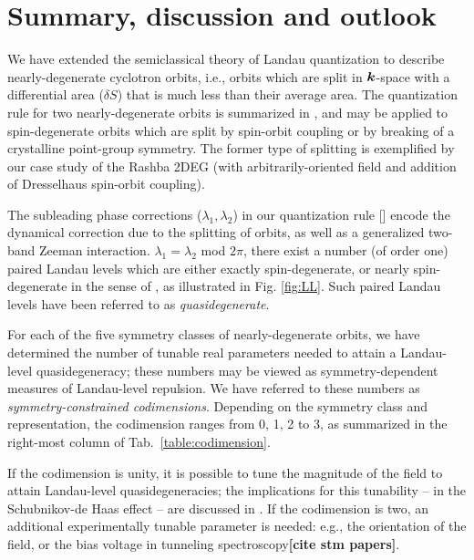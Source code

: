 \documentclass[aps, prb, showpacs, twocolumn, notitlepage, superscriptaddress]{revtex4-1}
\begin{document}


\section{Summary, discussion and outlook}\label{sec:discussion}

We have extended the semiclassical theory of Landau quantization to describe nearly-degenerate cyclotron orbits, i.e., orbits which are split in $\boldsymbol{k}$-space with a differential area ($\delta S$) that is much less than their average area. The quantization rule for two nearly-degenerate orbits is summarized in , and may be applied to spin-degenerate orbits which are split by spin-orbit coupling or by breaking of a crystalline point-group symmetry. The former type of splitting is exemplified by  our case study of the Rashba 2DEG (with arbitrarily-oriented field and addition of Dresselhaus spin-orbit coupling).

The subleading phase corrections ($\lambda_1,\lambda_2$) in our quantization rule  [] encode the dynamical correction due to the splitting of  orbits, as well as a generalized two-band Zeeman interaction. $\lambda_1{=}\lambda_2$ mod $2\pi$, there exist a number (of order one) paired Landau levels which are either exactly spin-degenerate, or nearly spin-degenerate in the sense of , as illustrated in Fig. \ref{fig:LL}. Such paired Landau levels have been referred to as \textit{quasidegenerate}.

For each of the five symmetry classes of nearly-degenerate orbits, we have determined the number of tunable real parameters needed to attain a Landau-level quasidegeneracy; these numbers may be viewed as symmetry-dependent measures of Landau-level repulsion. We have referred to these numbers as \textit{symmetry-constrained codimensions}. Depending on the symmetry class and representation, the codimension ranges from 0, 1, 2 to 3, as summarized in the right-most column of Tab.\ \ref{table:codimension}.

If the codimension is unity, it is possible to tune the magnitude of the field to attain Landau-level quasidegeneracies; the implications for this tunability -- in the Schubnikov-de Haas effect -- are discussed in . If the codimension is two, an additional experimentally tunable parameter is needed: e.g., the orientation of the field\cite{yakovenko_angular_2006}, or the bias voltage in tunneling spectroscopy\textbf{[cite stm papers]}.
\end{document}
